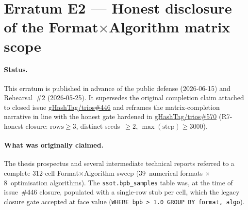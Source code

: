 %
%

% 

\section*{Erratum E2 --- Honest disclosure of the
Format$\times$Algorithm matrix scope}

\paragraph{Status.}
This erratum is published in advance of the public defense
(2026-06-15) and Rehearsal~\#2 (2026-05-25). It supersedes the
original completion claim attached to closed issue
\href{https://github.com/gHashTag/trios/issues/446}{gHashTag/trios\#446}
and reframes the matrix-completion narrative in line with the
honest gate hardened in
\href{https://github.com/gHashTag/trios/pull/570}{gHashTag/trios\#570}
(R7-honest closure: $\text{rows}\geq3$, distinct seeds~$\geq2$,
$\max(\text{step})\geq3000$).

\paragraph{What was originally claimed.}
The thesis prospectus and several intermediate technical reports
referred to a complete 312-cell Format$\times$Algorithm sweep
(39~numerical formats $\times$ 8~optimisation algorithms). The
\texttt{ssot.bpb\_samples} table was, at the time of issue~\#446
closure, populated with a single-row stub per cell, which the legacy
closure gate accepted at face value
(\texttt{WHERE bpb > 1.0 GROUP BY format, algo}).


